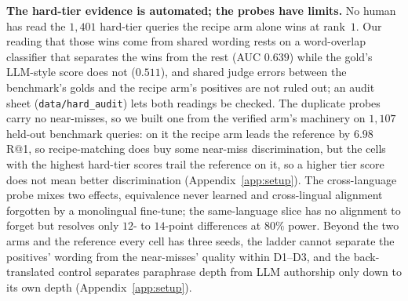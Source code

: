 \textbf{The hard-tier evidence is automated; the probes have limits.} No human has read the $1{,}401$ hard-tier queries the recipe arm alone wins at rank~$1$. Our reading that those wins come from shared wording rests on a word-overlap classifier that separates the wins from the rest (AUC $0.639$) while the gold's LLM-style score does not ($0.511$), and shared judge errors between the benchmark's golds and the recipe arm's positives are not ruled out; an audit sheet (\texttt{data/hard\_audit}) lets both readings be checked. The duplicate probes carry no near-misses, so we built one from the verified arm's machinery on $1{,}107$ held-out benchmark queries: on it the recipe arm leads the reference by $6.98$ R@1, so recipe-matching does buy some near-miss discrimination, but the cells with the highest hard-tier scores trail the reference on it, so a higher tier score does not mean better discrimination (Appendix~\ref{app:setup}). The cross-language probe mixes two effects, equivalence never learned and cross-lingual alignment forgotten by a monolingual fine-tune; the same-language slice has no alignment to forget but resolves only $12$- to $14$-point differences at $80\%$ power. Beyond the two arms and the reference every cell has three seeds, the ladder cannot separate the positives' wording from the near-misses' quality within D1--D3, and the back-translated control separates paraphrase depth from LLM authorship only down to its own depth (Appendix~\ref{app:setup}).
